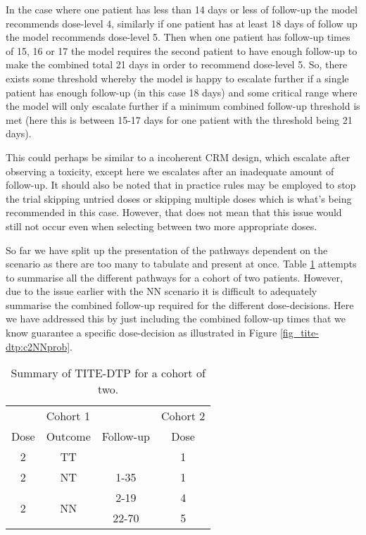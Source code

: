 In the case where one patient has less than 14 days or less of follow-up the model recommends dose-level 4, similarly if one patient has at least 18 days of follow up the model recommends dose-level 5. Then when one patient has follow-up times of 15, 16 or 17 the model requires the second patient to have enough follow-up to make the combined total 21 days in order to recommend dose-level 5. So, there exists some threshold whereby the model is happy to escalate further if a single patient has enough follow-up (in this case 18 days) and some critical range where the model will only escalate further if a minimum combined follow-up threshold is met (here this is between 15-17 days for one patient with the threshold being 21 days).

This could perhaps be similar to a incoherent CRM design, which escalate after observing a toxicity, except here we escalates after an inadequate amount of follow-up. It should also be noted that in practice rules may be employed to stop the trial skipping untried doses or skipping multiple doses which is what's being recommended in this case. However, that does not mean that this issue would still not occur even when selecting between two more appropriate doses. 

So far we have split up the presentation of the pathways dependent on the scenario as there are too many to tabulate and present at once. Table \ref{tab_tite-dtp:TITEDTP_c2_Sum} attempts to summarise all the different pathways for a cohort of two patients. However, due to the issue earlier with the NN scenario it is difficult to adequately summarise the combined follow-up required for the different dose-decisions. Here we have addressed this by just including the combined follow-up times that we know guarantee a specific dose-decision as illustrated in Figure \ref{fig_tite-dtp:c2NNprob}.

\begin{table}[H]
	\centering
	\caption{Summary of TITE-DTP for a cohort of two.}
	\label{tab_tite-dtp:TITEDTP_c2_Sum}
	\begin{tabular}{cccc}
		\hline
		\multicolumn{1}{l}{} & \multicolumn{2}{l}{Cohort 1}    & \multicolumn{1}{l}{Cohort 2} \\ \cline{2-4} 
		Dose                 & Outcome             & Follow-up & Dose                         \\ \hline
		2                    & TT                  &           & 1                            \\
		2                    & NT                  &  1-35     & 1                            \\
		\multirow{2}{*}{2}   & \multirow{2}{*}{NN} & 2-19      & 4                            \\
		&                     & 22-70     & 5                            \\ \hline
	\end{tabular}
\end{table}


